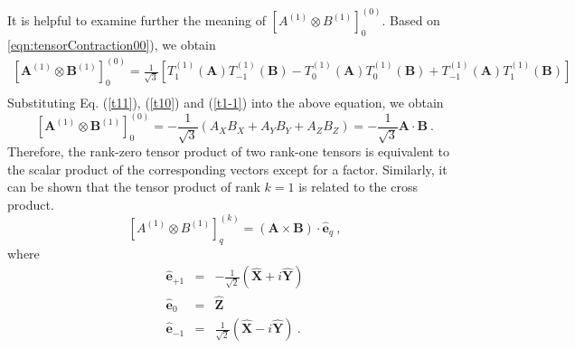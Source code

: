 It is helpful to examine further the meaning of $\left[  A^{(1)} \otimes B^{(1)} \right]^{(0)}_{0}$. 
Based on \autoref{eqn:tensorContraction00}), we obtain
\begin{eqnarray}
\left[ \mathbf{A}^{(1)}\otimes \mathbf{B}^{(1)} \right]_{0}^{(0)} =\frac{1}{\sqrt{3}}\left[T^{(1)}_{1}(\mathbf{A}) T^{(1)}_{-1}(\mathbf{B}) -T^{(1)}_{0}(\mathbf{A}) T^{(1)}_{0}(\mathbf{B}) +  T^{(1)}_{-1} (\mathbf{A}) T^{(1)}_{1}(\mathbf{B})\right] \nonumber \\
\end{eqnarray}
Substituting Eq. (\ref{t11}), (\ref{t10}) and (\ref{t1-1}) into the above equation, we obtain
\begin{equation}
\left[ \mathbf{A}^{(1)}\otimes \mathbf{B}^{(1)} \right]_{0}^{(0)}  = -\frac{1}{\sqrt{3}} (A_{X}B_{X}+ A_{Y}B_{Y} + A_{Z}B_{Z}) = -\frac{1}{\sqrt{3}} \mathbf{A}\cdot\mathbf{B} \ .
\end{equation}
Therefore, the rank-zero tensor product of two rank-one tensors is equivalent to the scalar product of the corresponding
 vectors except for a factor.  
Similarly, it can be shown that the tensor product of rank $k=1$ is related to the cross product. 
\begin{equation}
\left[ A^{(1)} \otimes B^{(1)} \right]_{q}^{(k)} = (\mathbf{A}\times \mathbf{B})\cdot \mathbf{\hat{e}}_{q} \ ,
\label{eqn:crossProduct}
\end{equation}
where
\begin{eqnarray}
\mathbf{\hat{e}}_{+1} &=& -\frac{1}{\sqrt{2}}(\mathbf{\hat{X}} + i \mathbf{\hat{Y}}) \nonumber \\
\mathbf{\hat{e}}_{0} &=& \mathbf{\hat{Z}} \nonumber \\
\mathbf{\hat{e}}_{-1} &=& \frac{1}{\sqrt{2}}(\mathbf{\hat{X}} - i \mathbf{\hat{Y}}) \ .
\end{eqnarray}

